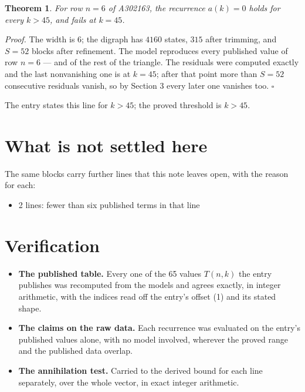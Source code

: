 \documentclass[11pt]{article}
\newtheorem{theorem}{Theorem}
\theoremstyle{definition}
\begin{document}
\begin{theorem} For row $n = 6$ of A302163, the recurrence $a(k) = 0$ holds for every $k > 45$, and fails at $k = 45$.\end{theorem}

{\itshape Proof.} The width is $6$; the digraph has $4160$ states, $315$ after trimming, and $S = 52$ blocks after refinement. The model reproduces every published value of row $n = 6$ --- and of the rest of the triangle. The residuals were computed exactly and the last nonvanishing one is at $k = 45$; after that point more than $S = 52$ consecutive residuals vanish, so by Section 3 every later one vanishes too. $\square$

The entry states this line for $k > 45$; the proved threshold is $k > 45$.

\section{What is not settled here}

The same blocks carry further lines that this note leaves open, with the reason for each:

\begin{itemize}

\item 2 lines: fewer than six published terms in that line

\end{itemize}

\section{Verification}

\begin{itemize}

\item {\bfseries The published table.} Every one of the 65 values $T(n,k)$ the entry publishes was recomputed from the models and agrees exactly, in integer arithmetic, with the indices read off the entry's offset (1) and its stated shape.

\item {\bfseries The claims on the raw data.} Each recurrence was evaluated on the entry's published values alone, with no model involved, wherever the proved range and the published data overlap.

\item {\bfseries The annihilation test.} Carried to the derived bound for each line separately, over the whole vector, in exact integer arithmetic.

\end{itemize}
\end{document}
